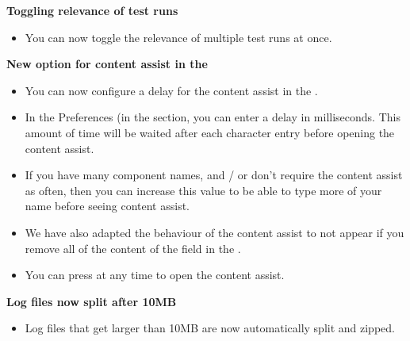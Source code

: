 \textbf{Toggling relevance of test runs}
\begin{itemize}
\item You can now toggle the relevance of multiple test runs at once.
\end{itemize}

\textbf{New option for content assist in the \gdcompnamesview{}}
\begin{itemize}
\item You can now configure a delay for the content assist in the \gdcompnamesview{}.
\item In the Preferences (in the  section, you can enter a delay in milliseconds. This amount of time will be waited after each character entry before opening the content assist.
\item If you have many component names, and / or don't require the content assist as often, then you can increase this value to be able to type more of your name before seeing content assist.
\item We have also adapted the behaviour of the content assist to not appear if you remove all of the content of the  field in the \gdcompnamesview{}. 
\item You can press  at any time to open the content assist.
\end{itemize}

\textbf{Log files now split after 10MB}
\begin{itemize}
\item Log files that get larger than 10MB are now automatically split and zipped.
\end{itemize}
